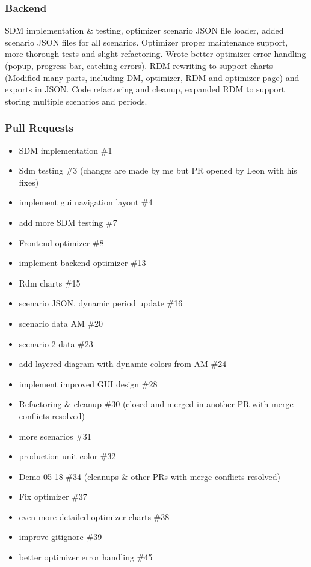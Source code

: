 \subsubsection*{Backend}
SDM implementation \& testing, optimizer scenario JSON file loader, added scenario JSON files for all scenarios. Optimizer proper maintenance support, more thorough tests and slight refactoring. Wrote better optimizer error handling (popup, progress bar, catching errors). \newline \newline
RDM rewriting to support charts (Modified many parts, including DM, optimizer, RDM and optimizer page) and exports in JSON. Code refactoring and cleanup, expanded RDM to support storing multiple scenarios and periods.
\subsubsection*{Pull Requests}
\begin{itemize}
    \item SDM implementation \#1
    \item Sdm testing \#3 (changes are made by me but PR opened by Leon with his fixes)
    \item implement gui navigation layout \#4
    \item add more SDM testing \#7
    \item Frontend optimizer \#8
    \item implement backend optimizer \#13
    \item Rdm charts \#15
    \item scenario JSON, dynamic period update \#16
    \item scenario data AM \#20
    \item scenario 2 data \#23
    \item add layered diagram with dynamic colors from AM \#24
    \item implement improved GUI design \#28
    \item Refactoring \& cleanup \#30 (closed and merged in another PR with merge conflicts resolved)
    \item more scenarios \#31
    \item production unit color \#32
    \item Demo 05 18 \#34 (cleanups \& other PRs with merge conflicts resolved)
    \item Fix optimizer \#37
    \item even more detailed optimizer charts \#38
    \item improve gitignore \#39
    \item better optimizer error handling \#45
\end{itemize}
